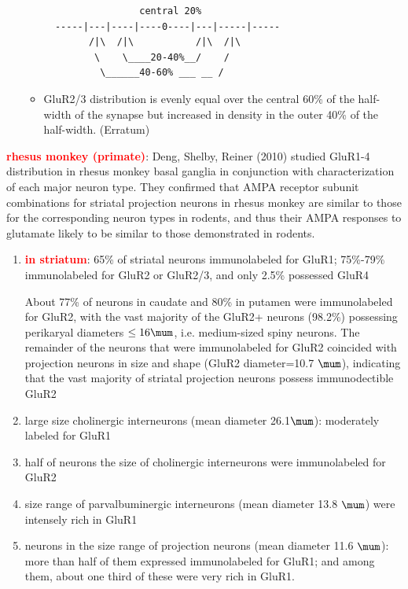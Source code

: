 \begin{itemize}
\begin{itemize}
 \begin{verbatim}
                 central 20%    
  -----|---|----|----0----|---|-----|-----
        /|\  /|\           /|\  /|\
         \    \____20-40%__/    /
          \______40-60% ___ __ /
 \end{verbatim}   
    
    \item GluR2/3 distribution is evenly equal over the central 60\% of the
     half-width of the synapse but increased in density in the outer 40\% of the
     half-width. \citep{bernard1998} (Erratum)
 \end{itemize}
 
 
\end{itemize}


\textcolor{red}{\bf rhesus monkey (primate)}: Deng, Shelby, Reiner (2010)
studied GluR1-4 distribution in rhesus monkey basal ganglia in conjunction with
characterization of each major neuron type. They confirmed that
AMPA receptor subunit combinations for striatal projection neurons in rhesus
monkey are similar to those for the corresponding neuron types in rodents, and
thus their AMPA responses to glutamate likely to be similar to those
demonstrated in rodents.  
\begin{enumerate}
  
  
  \item \textcolor{red}{\bf in striatum}: 65\% of striatal neurons immunolabeled
  for GluR1; 75\%-79\% immunolabeled for GluR2 or GluR2/3, and only 2.5\%
  possessed GluR4
  
  About 77\% of neurons in caudate and 80\% in putamen were immunolabeled for
  GluR2, with the vast majority of the GluR2+ neurons (98.2\%) possessing
  perikaryal diameters $\le 16 \mum$, i.e. medium-sized spiny neurons.  
  The remainder of the neurons that were immunolabeled for GluR2 coincided with
  projection neurons in size and shape (GluR2 diameter=10.7 $\mum$), indicating that
  the vast majority of striatal projection neurons possess immunodectible GluR2 
  
  \item large size cholinergic interneurons (mean diameter 26.1$\mum$): moderately
  labeled for GluR1
  
  \item  half of neurons the size of cholinergic interneurons were immunolabeled
  for GluR2
  
  \item  size range of parvalbuminergic interneurons (mean diameter 13.8 $\mum$) were
  intensely rich in GluR1
  
  \item neurons in the size range of projection neurons (mean diameter
  11.6 $\mum$): more than half of them expressed immunolabeled for GluR1; 
  and among them, about one third of these were very rich in GluR1.
   
\end{enumerate}

